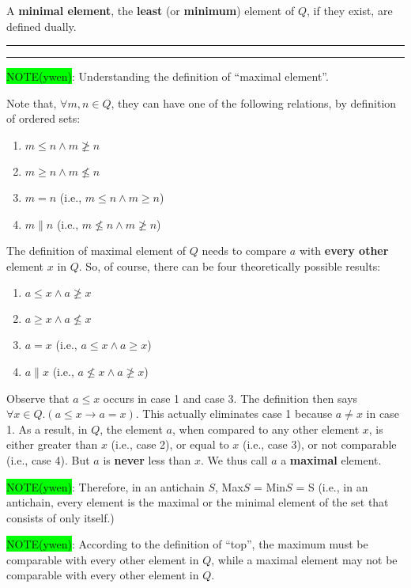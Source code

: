 \documentclass[12pt, letterpaper, oneside]{book}
\begin{document}
A \textbf{minimal element}, the \textbf{least} (or \textbf{minimum}) element of $Q$, if they exist, are defined dually.

\noindent\rule[-9pt]{1cm}{10pt}\rule{10cm}{0.4pt}

\colorbox{lime}{NOTE(ywen)}: Understanding the definition of ``maximal element''.

Note that, $\forall m, n \in Q$, they can have one of the following relations, by definition of ordered sets:
\begin{enumerate}
  \item $m \leqslant n \land m \ngeqslant n$
  \item $m \geqslant n \land m \nleqslant n$
  \item $m = n$ (i.e., $m \leqslant n \land m \geqslant n$)
  \item $m \parallel n$ (i.e., $m \nleqslant n \land m \ngeqslant n$)
\end{enumerate}

The definition of maximal element of $Q$ needs to compare $a$ with \textbf{every other} element $x$ in $Q$. So, of
course, there can be four theoretically possible results:
\begin{enumerate}
  \item $a \leqslant x \land a \ngeqslant x$
  \item $a \geqslant x \land a \nleqslant x$
  \item $a = x$ (i.e., $a \leqslant x \land a \geqslant x$)
  \item $a \parallel x$ (i.e., $a \nleqslant x \land a \ngeqslant x$)
\end{enumerate}

Observe that $a \leqslant x$ occurs in case 1 and case 3. The definition then says $\forall x \in Q. (a \leqslant x \rightarrow a = x)$.
This actually eliminates case 1 because $a \neq x$ in case 1. As a result, in $Q$, the element $a$, when compared to
any other element $x$, is either greater than $x$ (i.e., case 2), or equal to $x$ (i.e., case 3), or not comparable
(i.e., case 4). But $a$ is \textbf{never} less than $x$. We thus call $a$ a \textbf{maximal} element.

\colorbox{lime}{NOTE(ywen)}: Therefore, in an antichain $S$, Max$S$ = Min$S$ = S (i.e., in an antichain, every element
is the maximal or the minimal element of the set that consists of only itself.)

\colorbox{lime}{NOTE(ywen)}: According to the definition of ``top'', the maximum must be comparable with every other
element in $Q$, while a maximal element may not be comparable with every other element in $Q$.
\end{document}
